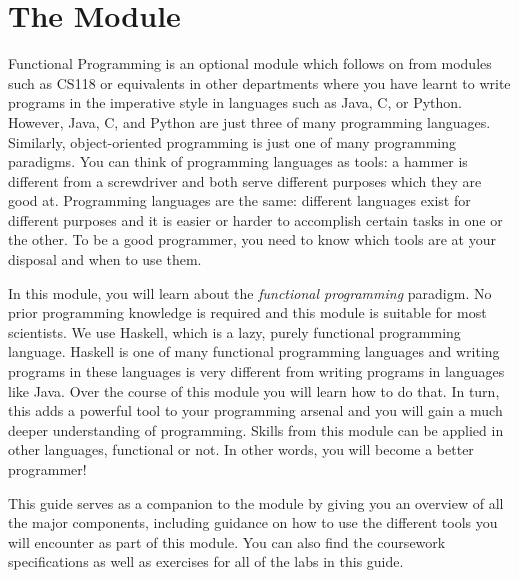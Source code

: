 
\chapter{The Module}

Functional Programming is an optional module which follows on from modules such as CS118 or equivalents in other departments where you have learnt to write programs in the imperative style in languages such as Java, C, or Python. However, Java, C, and Python are just three of many programming languages. Similarly, object-oriented programming is just one of many programming paradigms. You can think of programming languages as tools: a hammer is different from a screwdriver and both serve different purposes which they are good at. Programming languages are the same: different languages exist for different purposes and it is easier or harder to accomplish certain tasks in one or the other. To be a good programmer, you need to know which tools are at your disposal and when to use them.

In this module, you will learn about the \emph{functional programming} paradigm. No prior programming knowledge is required and this module is suitable for most scientists. We use Haskell, which is a lazy, purely functional programming language. Haskell is one of many functional programming languages and writing programs in these languages is very different from writing programs in languages like Java. Over the course of this module you will learn how to do that. In turn, this adds a powerful tool to your programming arsenal and you will gain a much deeper understanding of programming. Skills from this module can be applied in other languages, functional or not. In other words, you will become a better programmer!

This guide serves as a companion to the module by giving you an overview of all the major components, including guidance on how to use the different tools you will encounter as part of this module. You can also find the coursework specifications as well as exercises for all of the labs in this guide.